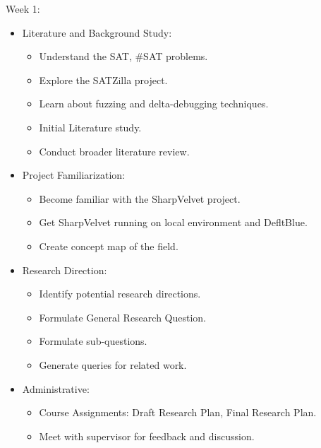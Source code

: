 \documentclass[english, a4paper]{article}
\begin{document}
Week 1:
\begin{itemize}
    \item Literature and Background Study:
    \begin{itemize}
        \item Understand the SAT, \#SAT problems.
        \item Explore the SATZilla project.
        \item Learn about fuzzing and delta-debugging techniques.
        \item Initial Literature study.
        \item Conduct broader literature review.
    \end{itemize}
    
    \item Project Familiarization:
    \begin{itemize}
        \item Become familiar with the SharpVelvet project.
        \item Get SharpVelvet running on local environment and DefltBlue.
        \item Create concept map of the field.
    \end{itemize}
    
    \item Research Direction:
    \begin{itemize}
        \item Identify potential research directions.
        \item Formulate General Research Question.
        \item Formulate sub-questions.
        \item Generate queries for related work.
    \end{itemize}
    
    \item Administrative:
    \begin{itemize}
        \item Course Assignments: Draft Research Plan, Final Research Plan.
        \item Meet with supervisor for feedback and discussion.
    \end{itemize}
\end{itemize}
\end{document}
